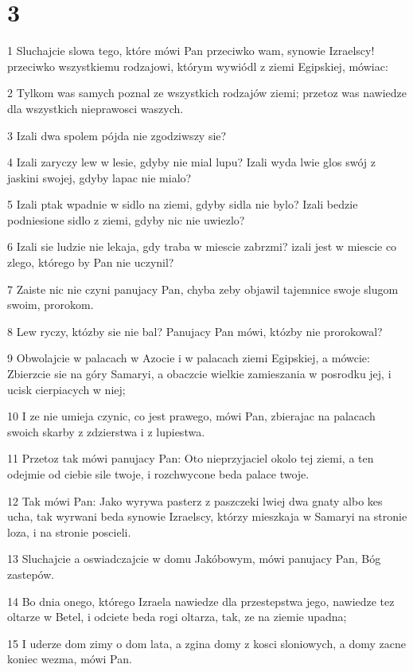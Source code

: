 \chapter{3}

\par 1 Sluchajcie slowa tego, które mówi Pan przeciwko wam, synowie Izraelscy! przeciwko wszystkiemu rodzajowi, którym wywiódl z ziemi Egipskiej, mówiac:
\par 2 Tylkom was samych poznal ze wszystkich rodzajów ziemi; przetoz was nawiedze dla wszystkich nieprawosci waszych.
\par 3 Izali dwa spolem pójda nie zgodziwszy sie?
\par 4 Izali zaryczy lew w lesie, gdyby nie mial lupu? Izali wyda lwie glos swój z jaskini swojej, gdyby lapac nie mialo?
\par 5 Izali ptak wpadnie w sidlo na ziemi, gdyby sidla nie bylo? Izali bedzie podniesione sidlo z ziemi, gdyby nic nie uwiezlo?
\par 6 Izali sie ludzie nie lekaja, gdy traba w miescie zabrzmi? izali jest w miescie co zlego, którego by Pan nie uczynil?
\par 7 Zaiste nic nie czyni panujacy Pan, chyba zeby objawil tajemnice swoje slugom swoim, prorokom.
\par 8 Lew ryczy, któzby sie nie bal? Panujacy Pan mówi, któzby nie prorokowal?
\par 9 Obwolajcie w palacach w Azocie i w palacach ziemi Egipskiej, a mówcie: Zbierzcie sie na góry Samaryi, a obaczcie wielkie zamieszania w posrodku jej, i ucisk cierpiacych w niej;
\par 10 I ze nie umieja czynic, co jest prawego, mówi Pan, zbierajac na palacach swoich skarby z zdzierstwa i z lupiestwa.
\par 11 Przetoz tak mówi panujacy Pan: Oto nieprzyjaciel okolo tej ziemi, a ten odejmie od ciebie sile twoje, i rozchwycone beda palace twoje.
\par 12 Tak mówi Pan: Jako wyrywa pasterz z paszczeki lwiej dwa gnaty albo kes ucha, tak wyrwani beda synowie Izraelscy, którzy mieszkaja w Samaryi na stronie loza, i na stronie poscieli.
\par 13 Sluchajcie a oswiadczajcie w domu Jakóbowym, mówi panujacy Pan, Bóg zastepów.
\par 14 Bo dnia onego, którego Izraela nawiedze dla przestepstwa jego, nawiedze tez oltarze w Betel, i odciete beda rogi oltarza, tak, ze na ziemie upadna;
\par 15 I uderze dom zimy o dom lata, a zgina domy z kosci sloniowych, a domy zacne koniec wezma, mówi Pan.

